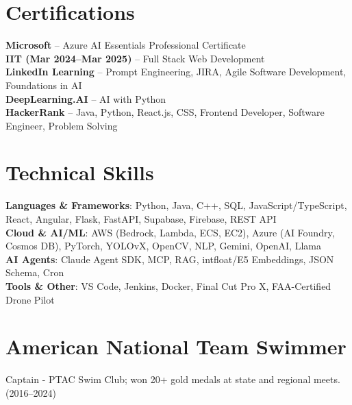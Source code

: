 \documentclass[letterpaper,10.8pt]{article} %
\begin{document}
\section{Certifications}
 \begin{itemize}[leftmargin=0.15in, label={}, itemsep=1pt]
    \small{\item{
     \textbf{Microsoft} – Azure AI Essentials Professional Certificate \\
     \textbf{IIT (Mar 2024–Mar 2025)} – Full Stack Web Development \\
     \textbf{LinkedIn Learning} – Prompt Engineering, JIRA, Agile Software Development, Foundations in AI \\
     \textbf{DeepLearning.AI} – AI with Python \\
     \textbf{HackerRank} – Java, Python, React.js, CSS, Frontend Developer, Software Engineer, Problem Solving
    }}
 \end{itemize}

\section{Technical Skills}
 \begin{itemize}[leftmargin=0.15in, label={}, itemsep=1pt]
    \small{\item{
     \textbf{Languages \& Frameworks}{: Python, Java, C++, SQL, JavaScript/TypeScript, React, Angular, Flask, FastAPI, Supabase, Firebase, REST API} \\
     \textbf{Cloud \& AI/ML}{: AWS (Bedrock, Lambda, ECS, EC2), Azure (AI Foundry, Cosmos DB), PyTorch, YOLOvX, OpenCV, NLP, Gemini, OpenAI, Llama} \\
     \textbf{AI Agents}{: Claude Agent SDK, MCP, RAG, intfloat/E5 Embeddings, JSON Schema, Cron} \\
     \textbf{Tools \& Other}{: VS Code, Jenkins, Docker, Final Cut Pro X, FAA-Certified Drone Pilot}
    }}
 \end{itemize}

\section{American National Team Swimmer}
 \begin{itemize}[leftmargin=0.15in, label={}, itemsep=1pt]
    \small{\item{
     Captain - PTAC Swim Club; won 20+ gold medals at state and regional meets. (2016–2024)
    }}
 \end{itemize}
\end{document}
